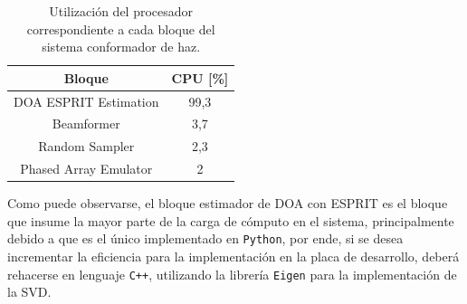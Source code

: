\begin{table}[ht!]
    \centering
    \begin{tabular}{|c|c|}
        \hline
        {\color[HTML]{000000} \textbf{Bloque}}       & {\color[HTML]{000000} \textbf{CPU {[}\%{]}}} \\ \hline
        {\color[HTML]{000000} DOA ESPRIT Estimation} & {\color[HTML]{000000} 99,3}                  \\ \hline
        Beamformer                                   & 3,7                                          \\ \hline
        {\color[HTML]{000000} Random Sampler}        & {\color[HTML]{000000} 2,3}                   \\ \hline
        {\color[HTML]{000000} Phased Array Emulator} & {\color[HTML]{000000} 2}                     \\ \hline
    \end{tabular}
    \caption{\label{tab:gr_cpu} Utilización del procesador correspondiente a cada bloque del sistema conformador de haz.}
\end{table}

Como puede observarse, el bloque estimador de DOA con ESPRIT es el bloque que insume la mayor parte de la carga de cómputo en el sistema, principalmente debido a que es el único implementado en \texttt{Python}, por ende, si se desea incrementar la eficiencia para la implementación en la placa de desarrollo, deberá rehacerse en lenguaje \texttt{C++}, utilizando la librería \texttt{Eigen} \cite{bib:eigen} para la implementación de la SVD.
